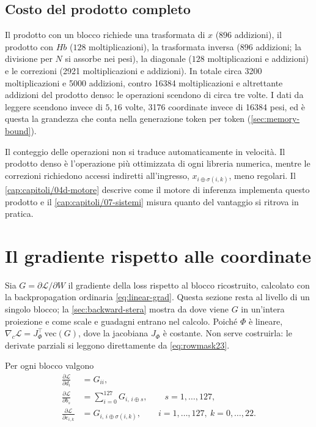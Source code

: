 \subsection{Costo del prodotto completo}
 Il prodotto con un blocco richiede una trasformata di $x$ ($896$ addizioni), il prodotto con $Hb$ ($128$ moltiplicazioni), la trasformata inversa ($896$ addizioni; la divisione per $N$ si assorbe nei pesi), la diagonale ($128$ moltiplicazioni e addizioni) e le correzioni (\num{2921} moltiplicazioni e addizioni). In totale circa \num{3200} moltiplicazioni e \num{5000} addizioni, contro \num{16384} moltiplicazioni e altrettante addizioni del prodotto denso: le operazioni scendono di circa tre volte. I dati da leggere scendono invece di $5{,}16$ volte, \num{3176} coordinate invece di \num{16384} pesi, ed è questa la grandezza che conta nella generazione token per token (\autoref{sec:memory-bound}).

Il conteggio delle operazioni non si traduce automaticamente in velocità. Il prodotto denso è l'operazione più ottimizzata di ogni libreria numerica, mentre le correzioni richiedono accessi indiretti all'ingresso, $x_{i\oplus\sigma(i,k)}$, meno regolari. Il \autoref{cap:capitoli/04d-motore} descrive come il motore di inferenza implementa questo prodotto e il \autoref{cap:capitoli/07-sistemi} misura quanto del vantaggio si ritrova in pratica.


\section{Il gradiente rispetto alle coordinate}
\label{sec:gradiente-coordinate}
\label{sec:esempio-gradiente-rowmask}

Sia $G=\partial\mathcal{L}/\partial W$ il gradiente della loss rispetto al blocco ricostruito, calcolato con la backpropagation ordinaria \eqref{eq:linear-grad}. Questa sezione resta al livello di un singolo blocco; la \autoref{sec:backward-stera} mostra da dove viene $G$ in un'intera proiezione e come scale e guadagni entrano nel calcolo. Poiché $\Phi$ è lineare, $\nabla_c\mathcal{L} = J_\Phi^\top\,\mathrm{vec}(G)$, dove la jacobiana $J_\Phi$ è costante. Non serve costruirla: le derivate parziali si leggono direttamente da \eqref{eq:rowmask23}.

\begin{proposizione}
Per ogni blocco valgono
\begin{align}
\frac{\partial\mathcal{L}}{\partial d_i} &= G_{ii}, \label{eq:grad-d}\\
\frac{\partial\mathcal{L}}{\partial b_s} &= \sum_{i=0}^{127} G_{i,\,i\oplus s}, \qquad s=1,\dots,127, \label{eq:grad-b}\\
\frac{\partial\mathcal{L}}{\partial e_{i,k}} &= G_{i,\,i\oplus\sigma(i,k)}, \qquad i=1,\dots,127,\ k=0,\dots,22. \label{eq:grad-e}
\end{align}
\end{proposizione}

